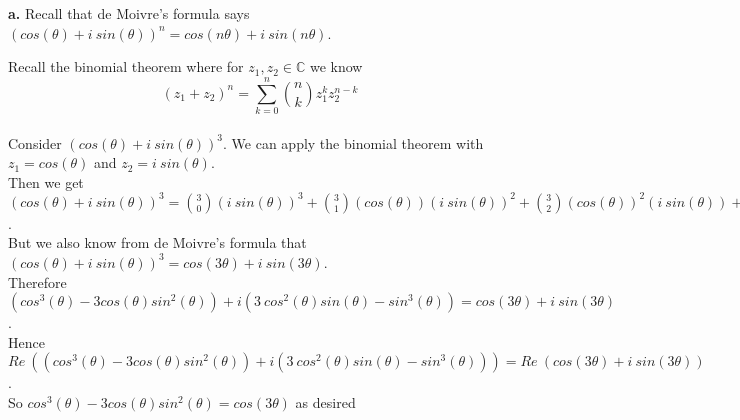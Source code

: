 \documentclass{article}
\begin{document}
{\Large\textbf{a.}} Recall that de Moivre's formula says $(cos(\theta) + i\:sin(\theta))^n = cos(n\theta) + i\:sin(n\theta)$.
\begin{center}
    \doublespacing
    Recall the binomial theorem where for $z_1, z_2\in\mathbb{C}$ we know \[(z_1 + z_2)^n =\sum _{k=0}^n\binom{n}{k} z_1^k z_2^{n-k}\]
    \\Consider $(cos(\theta) + i\:sin(\theta))^3$. We can apply the binomial theorem with $z_1 = cos(\theta)$ and $z_2 = i\:sin(\theta)$.
    \\Then we get $(cos(\theta) + i\:sin(\theta))^3 =\binom{3}{0} (i\:sin(\theta))^3 +\binom{3}{1} (cos(\theta))(i\:sin(\theta))^2 +\binom{3}{2} (cos(\theta))^2(i\:sin(\theta)) +\binom{3}{3} (cos(\theta))^3 = (cos^3 (\theta) - 3 cos(\theta)sin^2(\theta)) + i(3\:cos^2(\theta)sin(\theta) -sin^3(\theta))$.
    \break
    \\But we also know from de Moivre's formula that $(cos(\theta) + i\:sin(\theta))^3 = cos(3\theta) + i\:sin(3\theta)$.
    \\Therefore $(cos^3 (\theta) - 3 cos(\theta)sin^2(\theta)) + i(3\:cos^2(\theta)sin(\theta) -sin^3(\theta)) = cos(3\theta) + i\:sin(3\theta)$.
    \\Hence $Re\:((cos^3 (\theta) - 3 cos(\theta)sin^2(\theta)) + i(3\:cos^2(\theta)sin(\theta) -sin^3(\theta))) = Re\:(cos(3\theta) + i\:sin(3\theta))$.
    \\So $cos^3 (\theta) - 3 cos(\theta)sin^2 (\theta) = cos(3\theta)$ as desired \qedsymbol
\end{center}
\end{document}
